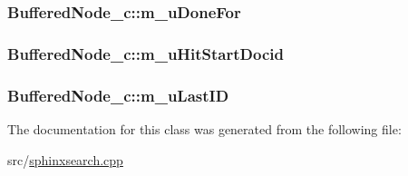 \hypertarget{classBufferedNode__c_af91cf22314ed5848b6b5c4fdec87ebcb}{
\subsubsection[{m\-\_\-u\-Done\-For}]{ Buffered\-Node\-\_\-c\-::m\-\_\-u\-Done\-For\hspace{0.3cm}{\ttfamily [protected]}}}\label{classBufferedNode__c_af91cf22314ed5848b6b5c4fdec87ebcb}
\hypertarget{classBufferedNode__c_ae0287f95dec23839698f1a8e54799142}{
\subsubsection[{m\-\_\-u\-Hit\-Start\-Docid}]{ Buffered\-Node\-\_\-c\-::m\-\_\-u\-Hit\-Start\-Docid\hspace{0.3cm}{\ttfamily [protected]}}}\label{classBufferedNode__c_ae0287f95dec23839698f1a8e54799142}
\hypertarget{classBufferedNode__c_a84663ba9ff8f1319552c5bfe3b8a89f8}{
\subsubsection[{m\-\_\-u\-Last\-I\-D}]{ Buffered\-Node\-\_\-c\-::m\-\_\-u\-Last\-I\-D\hspace{0.3cm}{\ttfamily [protected]}}}\label{classBufferedNode__c_a84663ba9ff8f1319552c5bfe3b8a89f8}


The documentation for this class was generated from the following file\-:\begin{DoxyCompactItemize}
\item 
src/\hyperlink{sphinxsearch_8cpp}{sphinxsearch.\-cpp}\end{DoxyCompactItemize}
